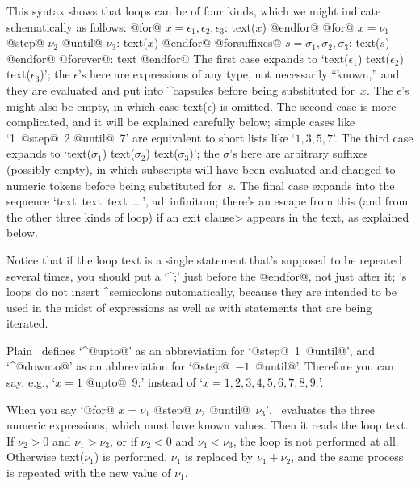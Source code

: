 This syntax shows that loops can be of four kinds, which we might
indicate schematically as follows:
\begindisplay
@for@ $x=\epsilon_1,\epsilon_2,\epsilon_3$: text($x$) @endfor@\cr
{}
@for@ $x=\nu_1$ @step@ $\nu_2$ @until@ $\nu_3$: text($x$) @endfor@\cr
{}
@forsuffixes@ $s=\sigma_1,\sigma_2,\sigma_3$: text($s$) @endfor@\cr
{}
@forever@: text @endfor@\cr
\enddisplay
The first case expands to
`text($\epsilon_1$) text($\epsilon_2$) text($\epsilon_3$)'; the
$\epsilon$'s here are expressions of any type, not necessarily ``known,''
and they are evaluated and put into ^{capsules} before being substituted
for~$x$. The $\epsilon$'s might also be empty, in which case
text($\epsilon$) is omitted.
The second case is more complicated, and it will be explained carefully
below; simple cases like `1~@step@~2 @until@~7' are equivalent to
short lists like `$1,3,5,7$'. The third case expands to
`text($\sigma_1$) text($\sigma_2$) text($\sigma_3$)'; the $\sigma$'s here
are arbitrary suffixes (possibly empty), in which subscripts will have been
evaluated and changed to numeric tokens before being substituted for~$s$.
The final case expands into the sequence `text~text~text~$\ldots$',
ad~infinitum; there's an escape from this (and from the other three kinds
of loop) if an \<exit clause> appears in the text, as explained below.

Notice that if the loop text is a single statement that's supposed to
be repeated several times, you should put a `^{;}' just before the
@endfor@, not just after it; \MF's loops do not insert ^{semicolons}
automatically, because they are intended to be used in the midst of
expressions as well as with statements that are being iterated.

Plain \MF\ defines `^@upto@' as an abbreviation for `@step@~1~@until@',
and `^@downto@' as an abbreviation for `@step@~$-1$~@until@'. Therefore
you can say, e.g., `\thinspace@for@ $x=1$ @upto@~9:\thinspace' instead of
`\thinspace@for@ $x=1,2,3,4,5,6,7,8,9$:\thinspace'.

\danger When you say `@for@ $x=\nu_1$ @step@ $\nu_2$ @until@~$\nu_3$',
\MF\ evaluates the three numeric expressions, which must have known values.
Then it reads the loop text. If $\nu_2>0$ and $\nu_1>\nu_3$, or if
$\nu_2<0$ and $\nu_1<\nu_3$, the loop is not performed at all. Otherwise
text($\nu_1$) is performed, $\nu_1$ is replaced by $\nu_1+\nu_2$, and
the same process is repeated with the new value of $\nu_1$.

